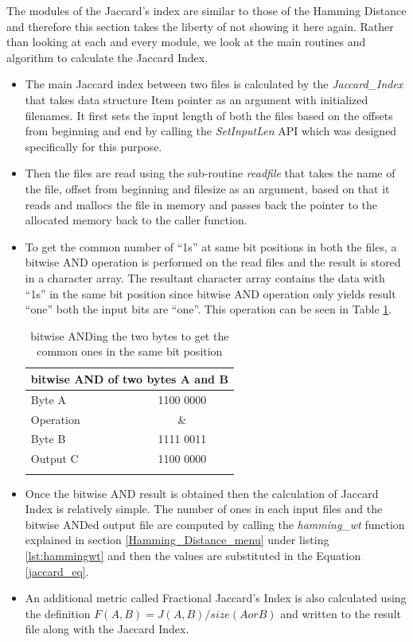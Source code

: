	The modules of the Jaccard's index are similar to those of the Hamming Distance and therefore this section takes the liberty of not showing it here again.
	Rather than looking at each and every module, we look at the main routines and algorithm to calculate the Jaccard Index.
	\begin{itemize}
		\item The main Jaccard index between two files is calculated by the \emph{Jaccard\_Index} that takes data structure Item pointer as an argument with initialized filenames. It first sets the input length of both the files based on the offsets from beginning and end by calling the \emph{SetInputLen} API which was designed specifically for this purpose.
		\item Then the files are read using the sub-routine \emph{readfile} that takes the name of the file, offset from beginning and filesize as an argument, based on that it reads and mallocs the file in memory and passes back the pointer to the allocated memory back to the caller function.
		\item To get the common number of ``1s'' at same bit positions in both the files, a bitwise AND operation is performed on the read files and the result is stored in a character array. The resultant character array contains the data with ``1s'' in the same bit position since bitwise AND operation only yields result ``one'' both the input bits are ``one''. This operation can be seen in Table \ref{bitwise_AND}.

	\begin{table}[!ht]
	\begin{center}
	\begin{tabular}{lc}
	\toprule
	\multicolumn{2}{c}{\textbf{bitwise AND of two bytes A and B}}\\
	\midrule
	Byte A &   1100 0000 \\
	Operation & \&\\
	Byte B &   1111 0011 \\
	Output C &   1100 0000 \\
	\addlinespace
	\bottomrule
	\end{tabular}
	\end{center}
	\caption{bitwise ANDing the two bytes to get the common ones in the same bit position}
	\label{bitwise_AND}
	\end{table}

		\item Once the bitwise AND result is obtained then the calculation of Jaccard Index is relatively simple. The number of ones in each input files and the bitwise ANDed output file are computed by calling the \emph{hamming\_wt} function explained in section \ref{Hamming_Distance_menu} under listing \ref{lst:hammingwt} and then the values are substituted in the Equation \ref{jaccard_eq}.
	\item An additional metric called Fractional Jaccard's Index is also calculated using the definition $F(A, B) = J(A, B)/ size(A or B)$ and written to the result file along with the Jaccard Index.
\end{itemize}


